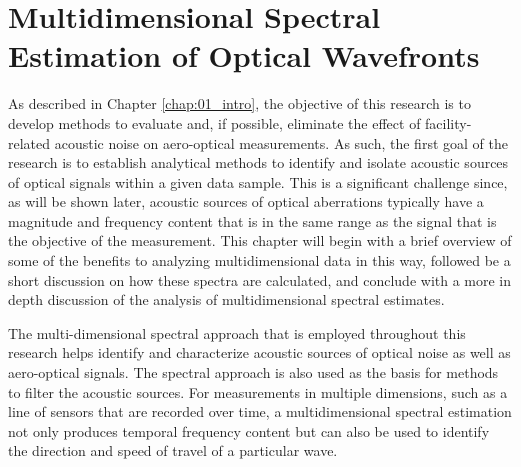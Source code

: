 
\chapter{Multidimensional Spectral Estimation of Optical Wavefronts}
\label{chap:04_dispersion}

As described in Chapter \ref{chap:01_intro}, the objective of this research is to develop methods to evaluate and, if possible, eliminate the effect of facility-related acoustic noise on aero-optical measurements.
As such, the first goal of the research is to establish analytical methods to identify and isolate acoustic sources of optical signals within a given data sample.
This is a significant challenge since, as will be shown later, acoustic sources of optical aberrations typically have a magnitude and frequency content that is in the same range as the signal that is the objective of the measurement.
This chapter will begin with a brief overview of some of the benefits to analyzing multidimensional data in this way, followed be a short discussion on how these spectra are calculated, and conclude with a more in depth discussion of the analysis of multidimensional spectral estimates.


The multi-dimensional spectral approach that is employed throughout this research helps identify and characterize acoustic sources of optical noise as well as aero-optical signals.
The spectral approach is also used as the basis for methods to filter the acoustic sources.
For measurements in multiple dimensions, such as a line of sensors that are recorded over time, a multidimensional spectral estimation not only produces temporal frequency content but can also be used to identify the direction and speed of travel of a particular wave.

